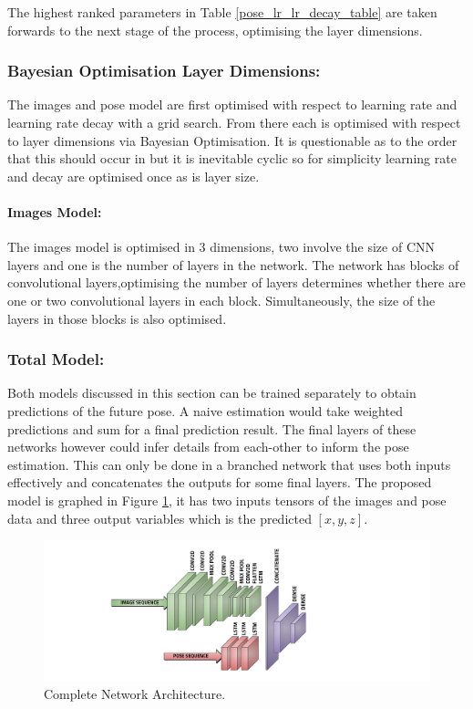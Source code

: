 \documentclass[11pt,twoside]{report}
\begin{document}
The highest ranked parameters in Table \ref{pose_lr_lr_decay_table} are taken forwards to the next stage of the process, optimising the layer dimensions.
 
\subsubsection{Bayesian Optimisation Layer Dimensions:}
The images and pose model are first optimised with respect to learning rate and learning rate decay with a grid search. From there each is optimised with respect to layer dimensions via Bayesian Optimisation. It is questionable as to the order that this should occur in but it is inevitable cyclic so for simplicity learning rate and decay are optimised once as is layer size.

\paragraph{Images Model:}
The images model is optimised in 3 dimensions, two involve the size of CNN layers and one is the number of layers in the network. The network has blocks of convolutional layers,optimising the number of layers determines whether there are one or two convolutional layers in each block. Simultaneously, the size of the layers in those blocks is also optimised.

\subsubsection{Total Model:}
Both models discussed in this section can be trained separately to obtain predictions of the future pose. A naive estimation would take weighted predictions and sum for a final prediction result. The final layers of these networks however could infer details from each-other to inform the pose estimation. This can only be done in a branched network that uses both inputs effectively and concatenates the outputs for some final layers. The proposed model is graphed in Figure \ref{total_network_architecture}, it has two inputs tensors of the images and pose data and three output variables which is the predicted $[x,y,z]$.

\noindent \begin{figure}[h!]
	\includegraphics[width = 1.0\hsize]{figures/final_model.png}
	\caption{Complete Network Architecture.}
	\label{total_network_architecture}
\end{figure}
\end{document}
